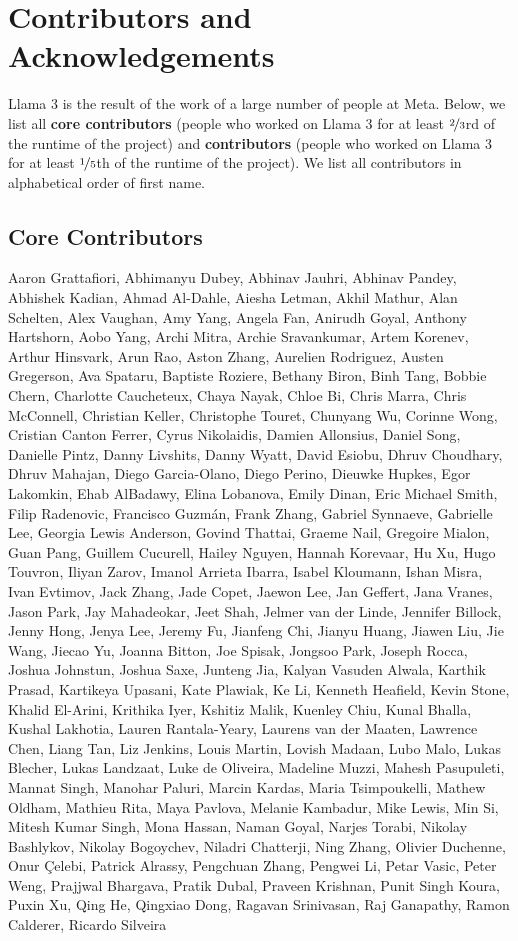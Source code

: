 \section*{Contributors and Acknowledgements}
Llama 3 is the result of the work of a large number of people at Meta.
Below, we list all \textbf{core contributors} (people who worked on Llama 3 for at least $\nicefrac{2}{3}$rd of the runtime of the project) and \textbf{contributors} (people who worked on Llama 3 for at least $\nicefrac{1}{5}$th of the runtime of the project).
We list all contributors in alphabetical order of first name.

\subsection*{Core Contributors}
Aaron Grattafiori, Abhimanyu Dubey, Abhinav Jauhri, Abhinav Pandey, Abhishek Kadian, Ahmad Al-Dahle, Aiesha Letman, Akhil Mathur, Alan Schelten, Alex Vaughan, Amy Yang, Angela Fan, Anirudh Goyal, Anthony Hartshorn, Aobo Yang, Archi Mitra, Archie Sravankumar, Artem Korenev, Arthur Hinsvark, Arun Rao, Aston Zhang, Aurelien Rodriguez, Austen Gregerson, Ava Spataru, Baptiste Roziere, Bethany Biron, Binh Tang, Bobbie Chern, Charlotte Caucheteux, Chaya Nayak, Chloe Bi, Chris Marra, Chris McConnell, Christian Keller, Christophe Touret, Chunyang Wu, Corinne Wong, Cristian Canton Ferrer, Cyrus Nikolaidis, Damien Allonsius, Daniel Song, Danielle Pintz, Danny Livshits, Danny Wyatt, David Esiobu, Dhruv Choudhary, Dhruv Mahajan, Diego Garcia-Olano, Diego Perino, Dieuwke Hupkes, Egor Lakomkin, Ehab AlBadawy, Elina Lobanova, Emily Dinan, Eric Michael Smith, Filip Radenovic, Francisco Guzmán, Frank Zhang, Gabriel Synnaeve, Gabrielle Lee, Georgia Lewis Anderson, Govind Thattai, Graeme Nail, Gregoire Mialon, Guan Pang, Guillem Cucurell, Hailey Nguyen, Hannah Korevaar, Hu Xu, Hugo Touvron, Iliyan Zarov, Imanol Arrieta Ibarra, Isabel Kloumann, Ishan Misra, Ivan Evtimov, Jack Zhang, Jade Copet, Jaewon Lee, Jan Geffert, Jana Vranes, Jason Park, Jay Mahadeokar, Jeet Shah, Jelmer van der Linde, Jennifer Billock, Jenny Hong, Jenya Lee, Jeremy Fu, Jianfeng Chi, Jianyu Huang, Jiawen Liu, Jie Wang, Jiecao Yu, Joanna Bitton, Joe Spisak, Jongsoo Park, Joseph Rocca, Joshua Johnstun, Joshua Saxe, Junteng Jia, Kalyan Vasuden Alwala, Karthik Prasad, Kartikeya Upasani, Kate Plawiak, Ke Li, Kenneth Heafield, Kevin Stone, Khalid El-Arini, Krithika Iyer, Kshitiz Malik, Kuenley Chiu, Kunal Bhalla, Kushal Lakhotia, Lauren Rantala-Yeary, Laurens van der Maaten, Lawrence Chen, Liang Tan, Liz Jenkins, Louis Martin, Lovish Madaan, Lubo Malo, Lukas Blecher, Lukas Landzaat, Luke de Oliveira, Madeline Muzzi, Mahesh Pasupuleti, Mannat Singh, Manohar Paluri, Marcin Kardas, Maria Tsimpoukelli, Mathew Oldham, Mathieu Rita, Maya Pavlova, Melanie Kambadur, Mike Lewis, Min Si, Mitesh Kumar Singh, Mona Hassan, Naman Goyal, Narjes Torabi, Nikolay Bashlykov, Nikolay Bogoychev, Niladri Chatterji, Ning Zhang, Olivier Duchenne, Onur Çelebi, Patrick Alrassy, Pengchuan Zhang, Pengwei Li, Petar Vasic, Peter Weng, Prajjwal Bhargava, Pratik Dubal, Praveen Krishnan, Punit Singh Koura, Puxin Xu, Qing He, Qingxiao Dong, Ragavan Srinivasan, Raj Ganapathy, Ramon Calderer, Ricardo Silveira 